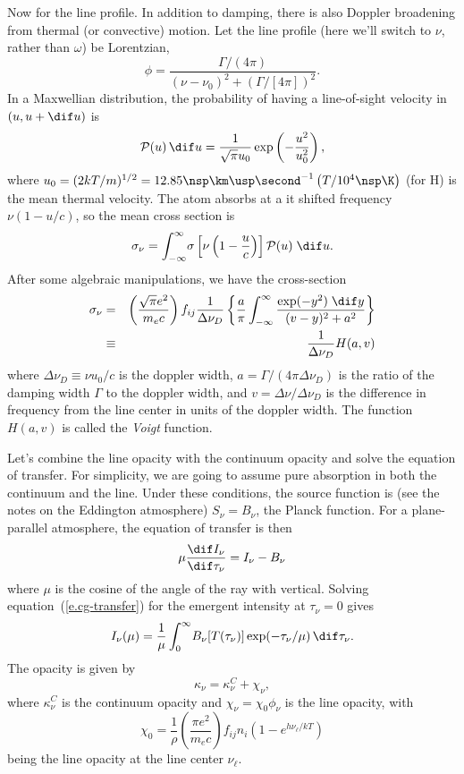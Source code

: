 Now for the line profile.  In addition to damping, there is also Doppler broadening from thermal (or convective) motion. Let the line profile (here we'll switch to $\nu$, rather than $\omega$) be Lorentzian,
\[ \phi = \frac{\Gamma/(4\pi)}{(\nu-\nu_{0})^{2} + (\Gamma/[4\pi])^{2}}. \]
In a Maxwellian distribution, the probability of having a line-of-sight velocity in $(u,u+\dif u)$ is
\[
	\mathcal{P}(u)\,\dif u = \frac{1}{\sqrt{\pi} u_{0}} \exp\left(-\frac{u^{2}}{u_{0}^{2}}\right),
\]
where $u_{0} = (2kT/m)^{1/2} = 12.85\nsp\km\usp\second^{-1}\left(T/10^{4}\nsp\K\right)$ (for H) is the mean thermal velocity. The atom absorbs at a it shifted frequency $\nu(1-u/c)$, so the mean cross section is
\begin{equation}\label{e.convolved-abs-cross-section}
	\sigma_{\nu} = \int_{-\infty}^{\infty}\!\sigma\left[\nu\left(1-\frac{u}{c}\right)\right] \mathcal{P}(u)\;\dif u.
\end{equation}
After some algebraic manipulations, we have the cross-section
\begin{eqnarray}
	\sigma_{\nu} &=& \left(\frac{\sqrt{\pi}e^{2}}{m_{e}c}\right) f_{ij} 
		\frac{1}{\Delta \nu_{D}}\left\{\frac{a}{\pi}\int_{-\infty}^{\infty}\frac{\exp(-y^{2})\;\dif y}{(v-y)^{2} + a^{2}} \right\}\nonumber \\
	&\equiv& \frac{1}{\Delta \nu_{D}}H(a,v)
\label{e.voigt}
\end{eqnarray}
where $\Delta\nu_{D} \equiv \nu u_{0}/c$ is the doppler width, $a = \Gamma/(4\pi\Delta\nu_{D})$ is the ratio of the damping width $\Gamma$ to the doppler width, and $v = \Delta\nu/\Delta\nu_{D}$ is the difference in frequency from the line center in units of the doppler width. The function $H(a,v)$ is called the \emph{Voigt} function.

Let's combine the line opacity with the continuum opacity and solve the equation of transfer.
For simplicity, we are going to assume pure absorption in both the continuum and the line.  Under these conditions, the source function is (see the notes on the Eddington atmosphere) $S_{\nu} = B_{\nu}$, the Planck function. For a plane-parallel atmosphere, the equation of transfer is then
\begin{equation}\label{e.cg-transfer}
\mu\frac{\dif I_{\nu}}{\dif\tau_{\nu}} = I_{\nu} - B_{\nu}
\end{equation}
where $\mu$ is the cosine of the angle of the ray with vertical. Solving equation~(\ref{e.cg-transfer}) for the emergent intensity at $\tau_{\nu} = 0$ gives
\begin{equation}\label{e.intensity}
I_{\nu}(\mu) = \frac{1}{\mu}\int_{0}^{\infty}\!B_{\nu}[T(\tau_{\nu})] \exp(-\tau_{\nu}/\mu) \,\dif\tau_{\nu}.
\end{equation}
The opacity is given by
\begin{equation}\label{e.total-opacity}
\kappa_{\nu} = \kappa_{\nu}^{C} + \chi_{\nu},
\end{equation}
where $\kappa_{\nu}^{C}$ is the continuum opacity and $\chi_{\nu} = \chi_{0}\phi_{\nu}$ is the line opacity, with 
\[
\chi_{0} = \frac{1}{\rho}\left(\frac{\pi e^{2}}{m_{e}c}\right)f_{ij}n_{i}\left(1 - e^{h\nu_{\ell}/kT}\right)
\]
being the line opacity at the line center $\nu_{\ell}$. 

